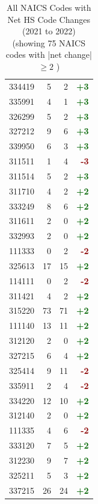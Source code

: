 \documentclass[11pt]{article}
\begin{document}
\begin{table}[H]
\begin{minipage}{0.48\textwidth}
\begin{tabular}{lrrr}
334419 & 5 & 2 & \textcolor{darkgreen}{\textbf{+3}} \\
335991 & 4 & 1 & \textcolor{darkgreen}{\textbf{+3}} \\
326299 & 5 & 2 & \textcolor{darkgreen}{\textbf{+3}} \\
327212 & 9 & 6 & \textcolor{darkgreen}{\textbf{+3}} \\
339950 & 6 & 3 & \textcolor{darkgreen}{\textbf{+3}} \\
311511 & 1 & 4 & \textcolor{darkred}{\textbf{-3}} \\
311514 & 5 & 2 & \textcolor{darkgreen}{\textbf{+3}} \\
311710 & 4 & 2 & \textcolor{darkgreen}{\textbf{+2}} \\
333249 & 8 & 6 & \textcolor{darkgreen}{\textbf{+2}} \\
311611 & 2 & 0 & \textcolor{darkgreen}{\textbf{+2}} \\
332993 & 2 & 0 & \textcolor{darkgreen}{\textbf{+2}} \\
111333 & 0 & 2 & \textcolor{darkred}{\textbf{-2}} \\
325613 & 17 & 15 & \textcolor{darkgreen}{\textbf{+2}} \\
114111 & 0 & 2 & \textcolor{darkred}{\textbf{-2}} \\
311421 & 4 & 2 & \textcolor{darkgreen}{\textbf{+2}} \\
315220 & 73 & 71 & \textcolor{darkgreen}{\textbf{+2}} \\
111140 & 13 & 11 & \textcolor{darkgreen}{\textbf{+2}} \\
312120 & 2 & 0 & \textcolor{darkgreen}{\textbf{+2}} \\
327215 & 6 & 4 & \textcolor{darkgreen}{\textbf{+2}} \\
325414 & 9 & 11 & \textcolor{darkred}{\textbf{-2}} \\
335911 & 2 & 4 & \textcolor{darkred}{\textbf{-2}} \\
334220 & 12 & 10 & \textcolor{darkgreen}{\textbf{+2}} \\
312140 & 2 & 0 & \textcolor{darkgreen}{\textbf{+2}} \\
111335 & 4 & 6 & \textcolor{darkred}{\textbf{-2}} \\
333120 & 7 & 5 & \textcolor{darkgreen}{\textbf{+2}} \\
312230 & 9 & 7 & \textcolor{darkgreen}{\textbf{+2}} \\
325211 & 5 & 3 & \textcolor{darkgreen}{\textbf{+2}} \\
337215 & 26 & 24 & \textcolor{darkgreen}{\textbf{+2}} \\
\bottomrule
\end{tabular}
\end{minipage}
\caption{All NAICS Codes with Net HS Code Changes (2021 to 2022) (showing 75 NAICS codes with |net change| $\geq 2$ )}
\end{table}
\end{document}
